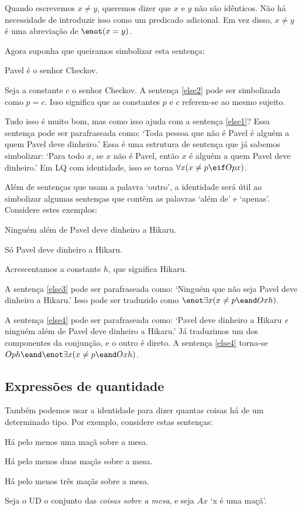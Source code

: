 Quando escrevemos $x \neq y$, queremos dizer que $x$ e $y$ não são idênticos. Não há necessidade de introduzir isso como um predicado adicional. Em vez disso, $x \neq y$ é uma abreviação de $\enot(x = y)$.

Agora suponha que queiramos simbolizar esta sentença:
\begin{earg}
\item[\ex{else2}] Pavel é o senhor Checkov.
\end{earg}
Seja a constante $c$ o senhor Checkov. A sentença \ref{else2} pode ser simbolizada como $p=c$. Isso significa que as constantes $p$ e $c$ referem-se ao mesmo sujeito.

Tudo isso é muito bom, mas como isso ajuda com a sentença \ref{else1}? Essa sentença pode ser parafraseada como: `Toda pessoa que não é Pavel é alguém a quem Pavel deve dinheiro.' Essa é uma estrutura de sentença que já sabemos simbolizar: `Para todo $x$, se $x$ não é Pavel, então $x$ é alguém a quem Pavel deve dinheiro.' Em LQ com identidade, isso se torna $\forall x (x\neq p \eif Opx)$.

Além de sentenças que usam a palavra `outro', a identidade será útil ao simbolizar algumas sentenças que contêm as palavras `além de' e `apenas'. Considere estes exemplos:

\begin{earg}
\item[\ex{else3}] Ninguém além de Pavel deve dinheiro a Hikaru.
\item[\ex{else4}] Só Pavel deve dinheiro a Hikaru.
\end{earg}

Acrescentamos a constante $h$, que significa Hikaru.

A sentença \ref{else3} pode ser parafraseada como: `Ninguém que não seja Pavel deve dinheiro a Hikaru.' Isso pode ser traduzido como $\enot\exists x(x\neq p \eand Oxh)$.

A sentença \ref{else4} pode ser parafraseada como: `Pavel deve dinheiro a Hikaru \emph{e} ninguém além de Pavel deve dinheiro a Hikaru.' Já traduzimos um dos componentes da conjunção, e o outro é direto. A sentença \ref{else4} torna-se $Oph \eand \enot\exists x(x\neq p \eand Oxh)$.


\subsection{Expressões de quantidade}
Também podemos usar a identidade para dizer quantas coisas há de um determinado tipo. Por exemplo, considere estas sentenças:
\begin{earg}
\item[\ex{atleast1}] Há pelo menos uma maçã sobre a mesa.
\item[\ex{atleast2}] Há pelo menos duas maçãs sobre a mesa.
\item[\ex{atleast3}] Há pelo menos três maçãs sobre a mesa.
\end{earg}
Seja o UD o conjunto das \emph{coisas sobre a mesa}, e seja $Ax$ `x é uma maçã'.

